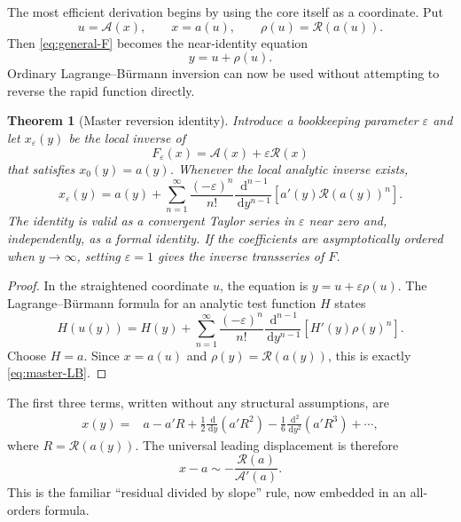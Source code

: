\documentclass[11pt,a4paper]{article}
\numberwithin{equation}{section}
\newtheorem{theorem}{Theorem}[section]
\theoremstyle{definition}
\theoremstyle{remark}
\newcommand{\dd}{\,\mathrm d}
\newcommand{\Core}{\mathcal A}
\newcommand{\Res}{\mathcal R}
\begin{document}
The most efficient derivation begins by using the core itself as a
coordinate.  Put
\begin{equation}\label{eq:rho-def}
 u=\Core(x),
 \qquad x=a(u),
 \qquad \rho(u)=\Res(a(u)).
\end{equation}
Then \eqref{eq:general-F} becomes the near-identity equation
\begin{equation}\label{eq:near-identity-u}
 y=u+\rho(u).
\end{equation}
Ordinary Lagrange--B\"urmann inversion can now be used without attempting to
reverse the rapid function directly.

\begin{theorem}[Master reversion identity]\label{thm:master-reversion}
Introduce a bookkeeping parameter $\varepsilon$ and let $x_\varepsilon(y)$
be the local inverse of
\begin{equation}\label{eq:F-epsilon}
 F_\varepsilon(x)=\Core(x)+\varepsilon\Res(x)
\end{equation}
that satisfies $x_0(y)=a(y)$.  Whenever the local analytic inverse exists,
\begin{equation}\label{eq:master-LB}
 \boxed{\quad
 x_\varepsilon(y)=a(y)+
 \sum_{n=1}^{\infty}\frac{(-\varepsilon)^n}{n!}
 \frac{\dd^{n-1}}{\dd y^{n-1}}
 \left[a'(y)\Res(a(y))^n\right].
 \quad}
\end{equation}
The identity is valid as a convergent Taylor series in $\varepsilon$ near
zero and, independently, as a formal identity.  If the coefficients are
asymptotically ordered when $y\to\infty$, setting $\varepsilon=1$ gives the
inverse transseries of $F$.
\end{theorem}

\begin{proof}
In the straightened coordinate $u$, the equation is
$y=u+\varepsilon\rho(u)$.  The Lagrange--B\"urmann formula for an analytic
test function $H$ states
\begin{equation}\label{eq:LB-H}
 H(u(y))=H(y)+\sum_{n=1}^{\infty}
 \frac{(-\varepsilon)^n}{n!}
 \frac{\dd^{n-1}}{\dd y^{n-1}}
 \left[H'(y)\rho(y)^n\right].
\end{equation}
Choose $H=a$.  Since $x=a(u)$ and $\rho(y)=\Res(a(y))$, this is exactly
\eqref{eq:master-LB}.
\end{proof}

The first three terms, written without any structural assumptions, are
\begin{align}
 x(y)={}&a-a'R
 +\frac12\frac{\dd}{\dd y}(a'R^2)
 -\frac16\frac{\dd^2}{\dd y^2}(a'R^3)+\cdots,
 \label{eq:master-first-three}
\end{align}
where $R=\Res(a(y))$.  The universal leading displacement is therefore
\begin{equation}\label{eq:universal-leading-shift}
 x-a\sim-\frac{\Res(a)}{\Core'(a)}.
\end{equation}
This is the familiar ``residual divided by slope'' rule, now embedded in an
all-orders formula.
\end{document}
